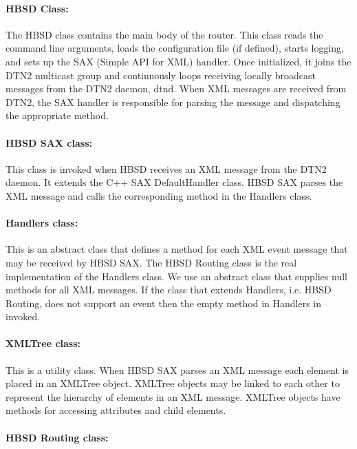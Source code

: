 \paragraph{HBSD Class:}

The HBSD class contains the main body of the router. This class reads the
command line arguments, loads the configuration file (if defined), starts
logging, and sets up the SAX (Simple API for XML) handler. Once initialized,
it joins the DTN2 multicast group and continuously loops receiving locally
broadcast messages from the DTN2 daemon, dtnd. When XML messages are received
from DTN2, the SAX handler is responsible for parsing the message and
dispatching the appropriate method.

\paragraph{HBSD SAX class:}

This class is invoked when HBSD receives an XML message from the DTN2 daemon.
It extends the C++ SAX DefaultHandler class. HBSD SAX parses the XML message
and calls the corresponding method in the Handlers class.

\paragraph{Handlers class:}

This is an abstract class that defines a method for each XML event message
that may be received by HBSD SAX. The HBSD Routing class is the real
implementation of the Handlers class. We use an abstract class that supplies
null methods for all XML messages. If the class that extends Handlers, i.e.
HBSD Routing, does not support an event then the empty method in Handlers in
invoked.

\paragraph{XMLTree class:}

This is a utility class. When HBSD SAX parses an XML message each element is
placed in an XMLTree object. XMLTree objects may be linked to each other to
represent the hierarchy of elements in an XML message. XMLTree objects have
methods for accessing attributes and child elements.

\paragraph{HBSD Routing class:}

